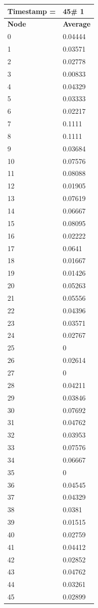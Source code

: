 \begin{tabular}{|l||l|}
\hline
\textbf{Timestamp =} & \textbf{45}\# 1\\\hline
	\textbf{Node} & \textbf{Average} \\ \hline
\hline
	0 & 0.04444 \\ \hline
	1 & 0.03571 \\ \hline
	2 & 0.02778 \\ \hline
	3 & 0.00833 \\ \hline
	4 & 0.04329 \\ \hline
	5 & 0.03333 \\ \hline
	6 & 0.02217 \\ \hline
	7 & 0.1111 \\ \hline
	8 & 0.1111 \\ \hline
	9 & 0.03684 \\ \hline
	10 & 0.07576 \\ \hline
	11 & 0.08088 \\ \hline
	12 & 0.01905 \\ \hline
	13 & 0.07619 \\ \hline
	14 & 0.06667 \\ \hline
	15 & 0.08095 \\ \hline
	16 & 0.02222 \\ \hline
	17 & 0.0641 \\ \hline
	18 & 0.01667 \\ \hline
	19 & 0.01426 \\ \hline
	20 & 0.05263 \\ \hline
	21 & 0.05556 \\ \hline
	22 & 0.04396 \\ \hline
	23 & 0.03571 \\ \hline
	24 & 0.02767 \\ \hline
	25 & 0 \\ \hline
	26 & 0.02614 \\ \hline
	27 & 0 \\ \hline
	28 & 0.04211 \\ \hline
	29 & 0.03846 \\ \hline
	30 & 0.07692 \\ \hline
	31 & 0.04762 \\ \hline
	32 & 0.03953 \\ \hline
	33 & 0.07576 \\ \hline
	34 & 0.06667 \\ \hline
	35 & 0 \\ \hline
	36 & 0.04545 \\ \hline
	37 & 0.04329 \\ \hline
	38 & 0.0381 \\ \hline
	39 & 0.01515 \\ \hline
	40 & 0.02759 \\ \hline
	41 & 0.04412 \\ \hline
	42 & 0.02852 \\ \hline
	43 & 0.04762 \\ \hline
	44 & 0.03261 \\ \hline
	45 & 0.02899 \\ \hline
\end{tabular}
